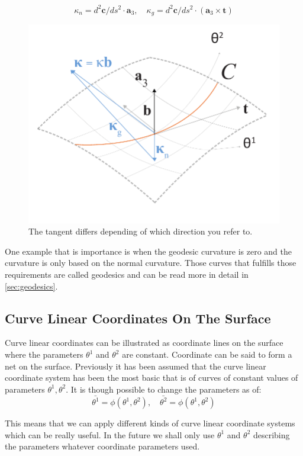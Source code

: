 \begin{equation}
\kappa_n = d^2\textbf{c}/ds^2 \cdot \textbf{a}_3,\quad \kappa_g = d^2\textbf{c}/ds^2 \cdot(\textbf{a}_3 \times \textbf{t})
\end{equation}


\begin{figure}[H]
\centering
\includegraphics[height=0.6\linewidth ]{figure/Theory/SFF.pdf}
\caption{The tangent differs depending of which direction you refer to. }
\label{fig:GeoCurvature}
\end{figure}

One example that is importance is when the geodesic curvature is zero and the curvature is only based on the normal curvature. Those curves that fulfills those requirements are called geodesics and can be read more in detail in \ref{sec:geodesics}.

\subsection{Curve Linear Coordinates On The Surface}

Curve linear coordinates can be illustrated as coordinate lines on the surface where the parameters $\theta^1$ and $\theta^2$ are constant. Coordinate can be said to form a net on the surface.
Previously it has been assumed that the curve linear coordinate system has been the most basic that is of curves of constant values of parameters $\theta^1,\theta^2$. It is though possible to change the parameters as of:
\begin{equation}
\bar{\theta^1} = \phi(\theta^1,\theta^2),\quad \bar{\theta^2} = \phi(\theta^1,\theta^2)
\end{equation}

This means that we can apply different kinds of curve linear coordinate systems which can be really useful. In the future we shall only use $\theta^1$ and $\theta^2$ describing the parameters whatever coordinate parameters used.


